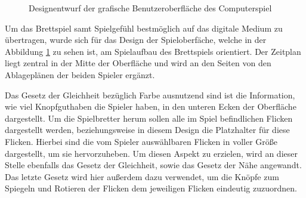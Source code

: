 \begin{figure}[!ht]
    \centering
    \caption{Designentwurf der grafische Benutzeroberfläche des Computerspiel}
    \label{fig:design-game-ui}
\end{figure}

Um das Brettspiel samt Spielgefühl bestmöglich auf das digitale Medium zu übertragen, wurde sich für das Design der Spieloberfäche, welche in der Abbildung \ref{fig:design-game-ui} zu sehen ist, am Spielaufbau des Brettspiels orientiert. Der Zeitplan liegt zentral in der Mitte der Oberfläche und wird an den Seiten von den Ablageplänen der beiden Spieler ergänzt.

Das Gesetz der Gleichheit bezüglich Farbe ausnutzend sind ist die Information, wie viel Knopfguthaben die Spieler haben, in den unteren Ecken der Oberfläche dargestellt. Um die Spielbretter herum sollen alle im Spiel befindlichen Flicken dargestellt werden, beziehungsweise in diesem Design die Platzhalter für diese Flicken. Hierbei sind die vom Spieler auswählbaren Flicken in voller Größe dargestellt, um sie hervorzuheben. Um diesen Aspekt zu erzielen, wird an dieser Stelle ebenfalls das Gesetz der Gleichheit, sowie das Gesetz der Nähe angewandt. Das letzte Gesetz wird hier außerdem dazu verwendet, um die Knöpfe zum Spiegeln und Rotieren der Flicken dem jeweiligen Flicken eindeutig zuzuordnen. 

